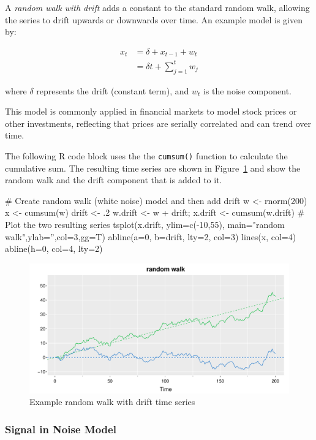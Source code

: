 A \emph{random walk with drift} adds a constant to the standard random walk, allowing the series to drift upwards or downwards over time. An example model is given by:

\begin{align*}x_t &= \delta + x_{t-1} + w_t \\
&= \delta t + \sum_{j=1}^t w_j
\end{align*}

\noindent where $\delta$ represents the drift (constant term), and $w_t$ is the noise component.

This model is commonly applied in financial markets to model stock prices or other investments, reflecting that prices are serially correlated and can trend over time.

The following R code block uses the the \texttt{cumsum()} function to calculate the cumulative sum. The resulting time series are shown in Figure~\ref{fig:figure4} and show the random walk and the drift component that is added to it.

\begin{samepage}
\begin{Rcode}
# Create random walk (white noise) model and then add drift
w <- rnorm(200)
x <- cumsum(w)
drift <- .2
w.drift <- w + drift;
x.drift <- cumsum(w.drift)
# Plot the two resulting series
tsplot(x.drift, ylim=c(-10,55), main="random walk",ylab='',col=3,gg=T)
abline(a=0, b=drift, lty=2, col=3)
lines(x, col=4)
abline(h=0, col=4, lty=2)
\end{Rcode}
\end{samepage}

\begin{figure}
\centering
\includegraphics[width=.75\textwidth]{figure4.pdf}
\caption{Example random walk with drift time series}
\label{fig:figure4}
\end{figure}

\subsubsection*{Signal in Noise Model}

